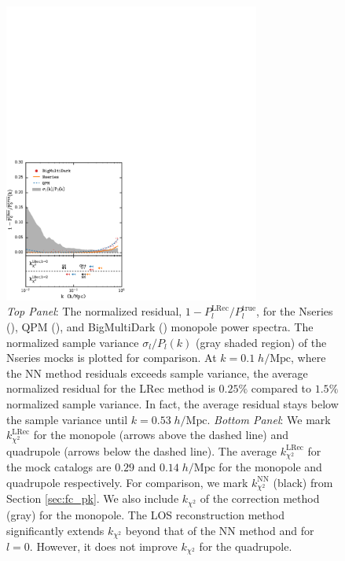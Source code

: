 \begin{figure}
\begin{center}
\includegraphics[width=0.75\textwidth]{figs/fc/mock_catalog_dlospeak_true_P0k_norm_resid_rebin6x.pdf} 
\caption{{\it Top Panel}: The normalized residual, 
$1 - P_l^\mathrm{LRec}/P_l^\mathrm{true}$, 
for the Nseries (\nseriescolor), QPM (\qpmcolor), and BigMultiDark (\bmdcolor)
monopole power spectra. The normalized sample variance $\sigma_l / P_l(k)$ 
(gray shaded region) of the Nseries mocks is plotted for comparison. At 
$k = 0.1 \;h/\mathrm{Mpc}$, where the NN method residuals exceeds sample 
variance, the average normalized residual for the LRec method is $0.25\%$ 
compared to $1.5\%$ normalized sample variance. In fact, the average 
residual stays below the sample variance until $k = 0.53\;h/\mathrm{Mpc}$.
{\it Bottom Panel}: We mark $k^\mathrm{LRec}_{\chi^2}$ for the monopole (arrows above the 
dashed line) and quadrupole (arrows below the dashed line). 
The average $k^\mathrm{LRec}_{\chi^2}$ for the mock catalogs
are $0.29$ and $0.14\;h/\mathrm{Mpc}$ for the monopole and quadrupole respectively. 
For comparison, we mark $k^\mathrm{NN}_{\chi^2}$ (black) from Section \ref{sec:fc_pk}. 
We also include $k_{\chi^2}$ of the \cite{Gil-Marin:2014aa} correction method (gray) for 
the monopole. The LOS reconstruction method significantly 
extends $k_{\chi^2}$ beyond that of the NN method and \cite{Gil-Marin:2014aa} for $l=0$. 
However, it does not improve $k_{\chi^2}$ for the quadrupole. 
} 
\label{fig:dlospeak_norm_resid}
\end{center}
\end{figure}
